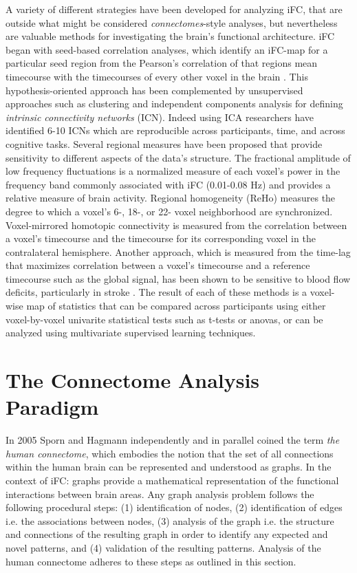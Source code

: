 A variety of different strategies have been developed for analyzing iFC, that are outside what might be considered \emph{connectomes}-style analyses, but nevertheless are valuable methods for investigating the brain's functional architecture. iFC began with seed-based correlation analyses, which identify an iFC-map for a particular seed region from the Pearson's correlation of that regions mean timecourse with the timecourses of every other voxel in the brain \cite{Biswal2010}. This hypothesis-oriented approach has been complemented by unsupervised approaches such as clustering and independent components analysis for defining \emph{intrinsic connectivity networks} (ICN). Indeed using ICA researchers have identified 6-10 ICNs which are reproducible across participants, time, and across cognitive tasks. Several regional measures have been proposed that provide sensitivity to different aspects of the data's structure. The fractional amplitude of low frequency fluctuations is a normalized measure of each voxel's power in the frequency band commonly associated with iFC (0.01-0.08 Hz) and provides a relative measure of brain activity. Regional homogeneity (ReHo) measures the degree to which a voxel's 6-, 18-, or 22- voxel neighborhood are synchronized. Voxel-mirrored homotopic connectivity is measured from the correlation between a voxel's timecourse and the timecourse for its corresponding voxel in the contralateral hemisphere. Another approach, which is measured from the time-lag that maximizes correlation between a voxel's timecourse and a reference timecourse such as the global signal, has been shown to be sensitive to blood flow deficits, particularly in stroke \cite{lv}. The result of each of these methods is a voxel-wise map of statistics that can be compared across participants using either voxel-by-voxel univarite statistical tests such as t-tests or anovas, or can be analyzed using multivariate supervised learning techniques.

\section{The Connectome Analysis Paradigm}

In 2005 Sporn and Hagmann \cite{Sporns2005,Hagmann2005} independently and in parallel coined the term \textit{the human connectome}, which embodies the notion that the set of all connections within the human brain can be represented and understood as graphs. In the context of iFC: graphs provide a mathematical representation of the functional interactions between brain areas. Any graph analysis problem follows the following procedural steps: (1) identification of nodes, (2) identification of edges i.e. the associations between nodes, (3) analysis of the graph i.e. the structure and connections of the resulting graph in order to identify any expected and novel patterns, and (4) validation of the resulting patterns. Analysis of the human connectome adheres to these steps as outlined in this section.

